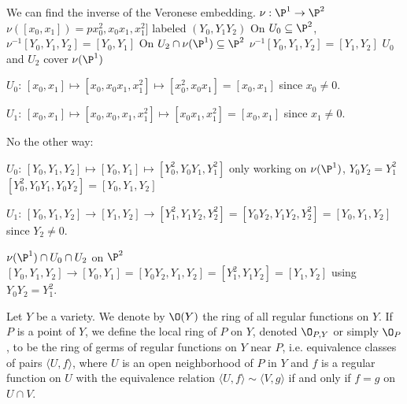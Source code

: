 \begin{ex}
We can find the inverse of the Veronese embedding. $\nu: \P^1 \to \P^2$
$\nu([x_0,x_1])= px_0^2,x_0x_1,x_1^2]$ labeled $(Y_0,Y_1Y_2)$
On $U_0 \subseteq \P^2$, 
$\nu^{-1}[Y_0,Y_1,Y_2]= [Y_0,Y_1]$
On $U_2 \cap \nu(\P^1) \subseteq \P^2$
$\nu^{-1}[Y_0,Y_1,Y_2]= [Y_1,Y_2]$
$U_0$ and $U_2$ cover $\nu(\P^1)$

$U_0$: $[x_0,x_1] \mapsto [x_0,x_0x_1,x_1^2] \mapsto [x_0^2,x_0x_1]= [x_0,x_1]$ since $x_0 \neq 0$. 

$U_1$: $[x_0,x_1] \mapsto [x_0,x_0,x_1,x_1^2] \mapsto [x_0x_1,x_1^2]= [x_0,x_1]$ since $x_1 \neq 0$. 


No the other way:

$U_0$: $[Y_0,Y_1,Y_2] \mapsto [Y_0,Y_1] \mapsto [Y_0^2,Y_0Y_1,Y_1^2]$ only working on $\nu(\P^1)$, $Y_0Y_2= Y_1^2$
$[Y_0^2,Y_0Y_1,Y_0Y_2]= [Y_0,Y_1,Y_2]$

$U_1$: $[Y_0,Y_1,Y_2] \to [Y_1,Y_2] \to [Y_1^2,Y_1Y_2,Y_2^2]= [Y_0Y_2,Y_1Y_2,Y_2^2]= [Y_0,Y_1,Y_2]$ since $Y_2 \neq 0$. 

$\nu(\P^1) \cap U_0 \cap U_2$ on $\P^2$
$[Y_0,Y_1,Y_2] \to [Y_0,Y_1]= [Y_0Y_2,Y_1,Y_2]= [Y_1^2,Y_1Y_2] = [Y_1,Y_2]$ using $Y_0Y_2=Y_1^2$. 
\end{ex}








\begin{dfn}
Let $Y$ be a variety. We denote by $\O(Y)$ the ring of all regular functions on $Y$. If $P$ is a point of $Y$, we define the local ring of $P$ on $Y$, denoted $\O_{P,Y}$ or simply $\O_P$, to be the ring of germs of regular functions on $Y$ near $P$, i.e. equivalence classes of pairs $\langle U,f \rangle$, where $U$ is an open neighborhood of $P$ in $Y$ and $f$ is a regular function on $U$ with the equivalence relation $\langle U,f \rangle \sim \langle V,g \rangle$ if and only if $f=g$ on $U \cap V$.
\end{dfn}


